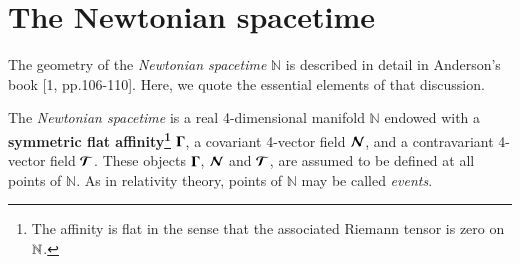 \section{The Newtonian spacetime}\label{chap16-sec2}

The geometry of the \textsl{Newtonian spacetime} $\mathbb{N}$ is described in detail in Anderson's book [1, pp.106-110]. Here, we quote  the essential elements of that discussion.

The \textsl{Newtonian spacetime} is a real 4-dimensional manifold  $\mathbb{N}$ endowed with a \textbf{symmetric flat affinity\footnote{The affinity is flat in the sense that the associated Riemann tensor is zero on $\mathbb{N}$.}} $\mathbf{\Gamma}$, a covariant 4-vector field $\bm{\mathcal{N}}$,  and a contravariant 4-vector field  $\bm{\mathcal{T}}$. These objects $\mathbf{\Gamma}$, $\bm{\mathcal{N}}$ and $\bm{\mathcal{T}}$, are assumed to be defined   at all points of $\mathbb{N}$. As in relativity theory, points of $\mathbb{N}$ may be  called \textsl{events}. 

